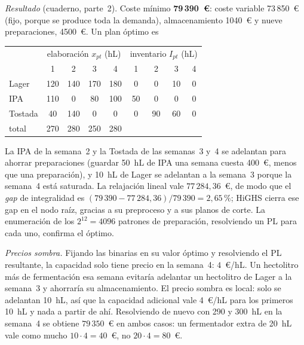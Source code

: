 \begin{ejemplo}
\emph{Resultado} (cuaderno, parte~2). Coste mínimo \textbf{79\,390~€}: coste variable 73\,850~€ (fijo, porque se produce toda la demanda), almacenamiento 1040~€ y nueve preparaciones, 4500~€. Un plan óptimo es
\begin{center}\small
\begin{tabular}{@{}lcccc@{\qquad}cccc@{}}
\toprule
 & \multicolumn{4}{c}{elaboración $x_{pt}$ (hL)} & \multicolumn{4}{c}{inventario $I_{pt}$ (hL)} \\
 & 1 & 2 & 3 & 4 & 1 & 2 & 3 & 4 \\
\midrule
Lager & 120 & 140 & 170 & 180 & 0 & 0 & 10 & 0 \\
IPA & 110 & 0 & 80 & 100 & 50 & 0 & 0 & 0 \\
Tostada & 40 & 140 & 0 & 0 & 0 & 90 & 60 & 0 \\
\midrule
total & 270 & 280 & 250 & 280 & & & & \\
\bottomrule
\end{tabular}
\end{center}
La IPA de la semana~2 y la Tostada de las semanas~3 y~4 se adelantan para ahorrar preparaciones (guardar 50~hL de IPA una semana cuesta 400~€, menos que una preparación), y 10~hL de Lager se adelantan a la semana~3 porque la semana~4 está saturada. La relajación lineal vale $77\,284{,}36$~€, de modo que el \emph{gap} de integralidad es $(79\,390-77\,284{,}36)/79\,390=2{,}65\,\%$; HiGHS cierra ese gap en el nodo raíz, gracias a su preproceso y a sus planos de corte. La enumeración de los $2^{12}=4096$ patrones de preparación, resolviendo un PL para cada uno, confirma el óptimo.

\emph{Precios sombra.} Fijando las binarias en su valor óptimo y resolviendo el PL resultante, la capacidad solo tiene precio en la semana~4: $4$~€/hL. Un hectolitro más de fermentación esa semana evitaría adelantar un hectolitro de Lager a la semana~3 y ahorraría su almacenamiento. El precio sombra es local: solo se adelantan 10~hL, así que la capacidad adicional vale 4~€/hL para los primeros 10~hL y nada a partir de ahí. Resolviendo de nuevo con 290 y 300~hL en la semana~4 se obtiene $79\,350$~€ en ambos casos: un fermentador extra de 20~hL vale como mucho $10\cdot 4=40$~€, no $20\cdot 4=80$~€.
\end{ejemplo}

